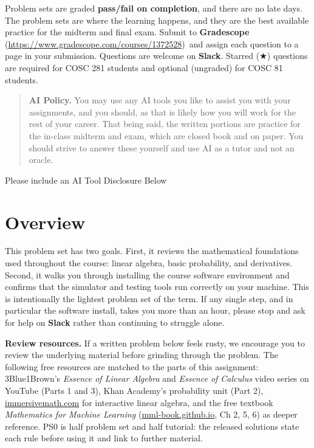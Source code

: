 \documentclass[11pt]{article}
\title{\textbf{\coursenumber:} #1}
\author{\textbf{Due} #2\\
  }
\date{}
\newcommand{\dgreen}[1]{\textcolor{DartmouthGreen}{#1}}
\newcommand{\dgbf}[1]{\textbf{\dgreen{#1}}}      %
\newcommand{\gradescopelink}{\textbf{Gradescope} (\url{https://www.gradescope.com/courses/1372528})}
\DeclareRobustCommand{\callout}[2][gray!10]{%
  \begin{tcolorbox}[left=8pt, arc=0pt, outer arc=0pt,
                    colframe=#1, colback=#1, coltext=black]#2\end{tcolorbox}}
\newcommand{\coursenotice}{%
  \callout{Problem sets are graded \textbf{pass/fail on completion}, and
  there are no late days. The problem sets are where the learning happens,
  and they are the best available practice for the midterm and final exam.
  Submit to \gradescopelink\ and assign each question to a page in your
  submission. Questions are welcome on \dgbf{Slack}. Starred ($\bigstar$)
  questions are required for COSC 281 students and optional (ungraded) for
  COSC 81 students.}}
\begin{document}
\maketitle
\coursenotice
\begin{quote}\small\textbf{AI Policy.} You may use any AI tools you like to assist you with your assignments, and you should, as that is likely how you will work for the rest of your career. 
That being said, the written portions are practice for the in-class midterm and exam, which are closed book and on paper. You should strive to answer these yourself and use AI as a tutor and not an oracle.
\end{quote}

\callout{Please include an AI Tool Disclosure Below \vspace{50pt}}

\newpage
\section*{Overview}
This problem set has two goals. First, it reviews the mathematical foundations used throughout the course: linear algebra, basic probability, and derivatives. Second, it walks you through installing the course software environment and confirms that the simulator and testing tools run correctly on your machine.
This is intentionally the lightest problem set of the term. If any single step, and in particular the software install, takes you more than an hour, please stop and ask for help on \dgbf{Slack} rather than continuing to struggle alone.

\callout{\textbf{Review resources.} If a written problem below feels rusty,
we encourage you to review the underlying material before grinding through
the problem. The following free resources are matched to the parts of this
assignment: 3Blue1Brown's \emph{Essence of Linear Algebra} and \emph{Essence
of Calculus} video series on YouTube (Parts 1 and 3), Khan
Academy's probability unit (Part 2),
\href{https://immersivemath.com}{immersivemath.com} for interactive linear
algebra, and the free textbook \emph{Mathematics for Machine Learning}
(\href{https://mml-book.github.io}{mml-book.github.io}, Ch 2, 5, 6) as deeper reference.
PS0 is half problem set and half tutorial: the released solutions state each
rule before using it and link to further material.}
\end{document}
